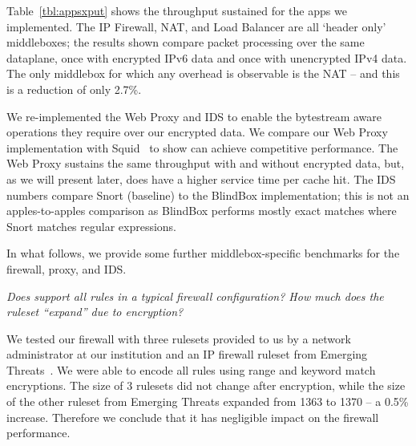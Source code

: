 
Table~\ref{tbl:appsxput} shows the throughput sustained for the apps we implemented.
The IP Firewall, NAT, and Load Balancer are all `header only' middleboxes; the results shown compare packet processing over the same dataplane, once with encrypted IPv6 data and once with unencrypted IPv4 data.
The only middlebox for which any overhead is observable is the NAT -- and this is a reduction of only 2.7\%.

We re-implemented the Web Proxy and IDS to enable the bytestream aware operations they require over our encrypted data. 
We compare our Web Proxy implementation with Squid~\cite{squid} to show \sys can achieve competitive performance. 
The Web Proxy sustains the same throughput with and without encrypted data, but, as we will present later, 
does have a higher service time per cache hit.
The IDS numbers compare Snort (baseline) to the BlindBox implementation; this is not an apples-to-apples comparison as BlindBox performs mostly exact matches where Snort matches regular expressions.

In what follows, we provide some further middlebox-specific benchmarks for the firewall, proxy, and IDS.

{\it Does \sys support all rules in a typical firewall configuration? How much does the ruleset ``expand'' due to encryption?}

We tested our firewall with three rulesets provided to us by a network administrator at our institution and an IP firewall ruleset from Emerging Threats~\cite{emergingthreats}. We were able to encode all rules using range and keyword match encryptions. The size of 3 rulesets did not change after encryption, while the size of the other ruleset from Emerging Threats expanded from 1363 to 1370 -- a 0.5\% increase. Therefore we conclude that it has negligible impact on the firewall performance.



